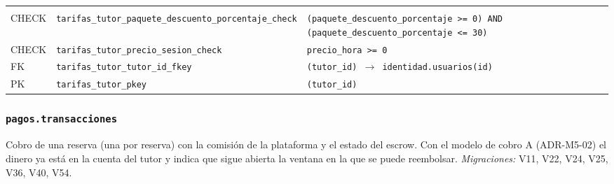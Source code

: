 {\small
\begin{xltabular}{\textwidth}{@{}>{\raggedright\arraybackslash}p{1.7cm} >{\raggedright\arraybackslash}p{4.6cm} L@{}}
    \toprule
     &  &  \\
    \midrule
    \endfirsthead
    \toprule
     &  &  \\
    \midrule
    \endhead
    \bottomrule
    \endfoot
    CHECK & \texttt{tarifas\_\allowbreak{}tutor\_\allowbreak{}paquete\_\allowbreak{}descuento\_\allowbreak{}porcentaje\_\allowbreak{}check} & \texttt{(\allowbreak{}paquete\_\allowbreak{}descuento\_\allowbreak{}porcentaje \textgreater{}= 0) AND (\allowbreak{}paquete\_\allowbreak{}descuento\_\allowbreak{}porcentaje \textless{}= 30)} \\
    CHECK & \texttt{tarifas\_\allowbreak{}tutor\_\allowbreak{}precio\_\allowbreak{}sesion\_\allowbreak{}check} & \texttt{precio\_\allowbreak{}hora \textgreater{}= 0} \\
    FK & \texttt{tarifas\_\allowbreak{}tutor\_\allowbreak{}tutor\_\allowbreak{}id\_\allowbreak{}fkey} & \texttt{(\allowbreak{}tutor\_\allowbreak{}id) $\rightarrow$ identidad.usuarios(\allowbreak{}id)} \\
    PK & \texttt{tarifas\_\allowbreak{}tutor\_\allowbreak{}pkey} & \texttt{(\allowbreak{}tutor\_\allowbreak{}id)} \\
\end{xltabular}
}

\subsubsection{\texorpdfstring{\texttt{pagos.transacciones}}{pagos.transacciones}}\label{dd:pagos.transacciones}

Cobro de una reserva (una por reserva) con la comisión de la plataforma y el estado del \gls{escrow}. Con el modelo de cobro A (ADR-M5-02) el dinero ya está en la cuenta del tutor y  indica que sigue abierta la ventana en la que se puede reembolsar. \emph{Migraciones:} V11, V22, V24, V25, V36, V40, V54.

